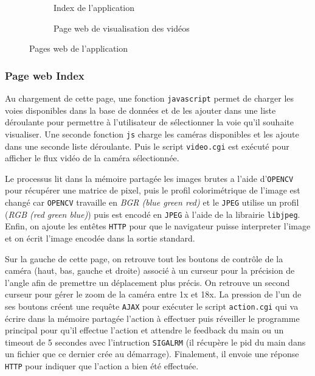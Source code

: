 \documentclass[a4paper, 11pt, french]{article}
\begin{document}
\begin{figure}
  \centering
  \begin{subfigure}[b]{0.45\textwidth}
    \caption{Index de l'application}
    \label{fig:pageWeb}
  \end{subfigure}
  \begin{subfigure}[b]{0.45\textwidth}
    \caption{Page web de visualisation des vidéos}
    \label{fig:pageVideo}
  \end{subfigure}
  \caption{Pages web de l'application}
\end{figure}

\subsubsection{Page web Index}
Au chargement de cette page, une fonction \texttt{javascript} permet de charger les voies disponibles dans la base de données et de les ajouter dans une liste déroulante pour permettre à l'utilisateur de sélectionner la voie qu'il souhaite visualiser. Une seconde fonction \texttt{js} charge les caméras disponibles et les ajoute dans une seconde liste déroulante. Puis le script \texttt{video.cgi} est exécuté pour afficher le flux vidéo de la caméra sélectionnée.

Le processus lit dans la mémoire partagée les images brutes a l'aide d'\texttt{OPENCV} pour récupérer une matrice de pixel, puis le profil colorimétrique de l'image est changé car \texttt{OPENCV} travaille en \textit{BGR (blue green red)} et le \texttt{JPEG} utilise un profil (\textit{RGB (red green blue)}) puis est encodé en \texttt{JPEG} à l'aide de la librairie \texttt{libjpeg}. Enfin, on ajoute les entêtes \texttt{HTTP} pour que le navigateur puisse interpreter l'image et on écrit l'image encodée dans la sortie standard.

Sur la gauche de cette page, on retrouve tout les boutons de contrôle de la caméra (haut, bas, gauche et droite) associé à un curseur pour la précision de l'angle afin de premettre un déplacement plus précis. On retrouve un second curseur pour gérer le zoom de la caméra entre 1x et 18x. La pression de l'un de ses boutons créent une requête \texttt{AJAX} pour exécuter le script \texttt{action.cgi} qui va écrire dans la mémoire partagée l'action à effectuer puis réveiller le programme principal pour qu'il effectue l'action et attendre le feedback du main ou un timeout de 5 secondes avec l'intruction \texttt{SIGALRM} (il récupère le pid du main dans un fichier que ce dernier crée au démarrage). Finalement, il envoie une réponse \texttt{HTTP} pour indiquer que l'action a bien été effectuée.
\end{document}
